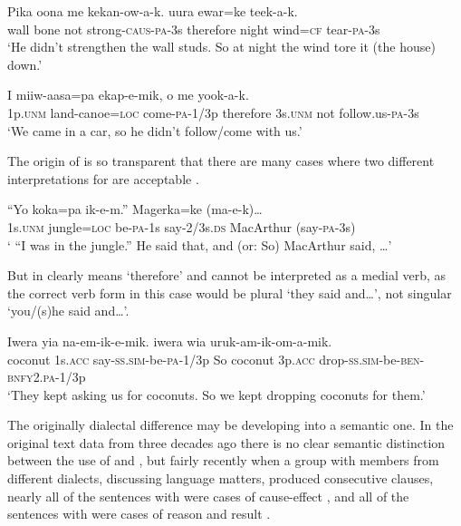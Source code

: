 \ea%
\label{ex:3:x735}
\gll Pika oona me kekan-ow-a-k.  uura ewar=ke teek-a-k.\\
wall bone not strong-\textsc{caus}-\textsc{pa}-3s therefore night wind=\textsc{cf} tear-\textsc{pa}-3s\\
\glt`He didn't strengthen the wall studs. So at night the wind tore it (the house) down.'
\z

\ea%
\label{ex:3:x1413}
\gll I miiw-aasa=pa ekap-e-mik,  o me yook-a-k.\\
1p.\textsc{unm} land-canoe=\textsc{loc} come-\textsc{pa}-1/3p therefore 3s.\textsc{unm} not follow.us-\textsc{pa}-3s\\
\glt`We came in a car, so he didn't follow/come with us.'
\z

The origin of  is so transparent that there are many cases where two different interpretations for  are acceptable . 

\ea%
\label{ex:3:x734}
\gll ``Yo koka=pa ik-e-m.''  Magerka=ke (ma-e-k){\dots} \\
1s.\textsc{unm} jungle=\textsc{loc} be-\textsc{pa}-1s say-2/3s.\textsc{ds} MacArthur (say-\textsc{pa}-3s)\\
\glt` ``I was in the jungle.'' He said that, and (or: So) MacArthur said, {\dots}'
\z

But in   clearly means `therefore' and cannot be interpreted as a medial verb, as the correct verb form in this case would be plural  `they said and{\dots}', not singular  `you/(s)he said and{\dots}'.

\ea%
\label{ex:3:x733}
\gll Iwera yia na-em-ik-e-mik.  iwera wia uruk-am-ik-om-a-mik.\\
coconut 1s.\textsc{acc} say-\textsc{ss}.\textsc{sim}-be-\textsc{pa}-1/3p So coconut 3p.\textsc{acc} drop-\textsc{ss}.\textsc{sim}-be-\textsc{ben}-\textsc{bnfy}2.\textsc{pa}-1/3p\\
\glt`They kept asking us for coconuts. So we kept dropping coconuts for them.'
\z

The originally dialectal difference may be developing into a semantic one. In the original text data from three decades ago there is no clear semantic distinction between the use of  and , but fairly recently when a group with members from different dialects, discussing language matters, produced consecutive clauses, nearly all of the sentences with  were cases of cause-effect , and all of the sentences with  were cases of reason and result . 

